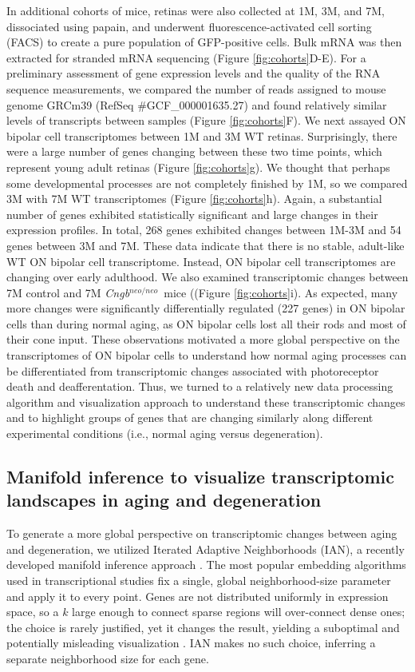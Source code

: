 \documentclass[11pt, a4paper]{article}
\newcommand{\cngb}{\textit{Cngb$^{neo/neo}$}~}
\begin{document}
In additional cohorts of mice, retinas were also collected at 1M, 3M, and 7M, dissociated using papain, and underwent fluorescence-activated cell sorting (FACS) to create a pure population of GFP-positive cells.  Bulk mRNA was then extracted for stranded mRNA sequencing (Figure \ref{fig:cohorts}D-E).  For a preliminary assessment of gene expression levels and the quality of the RNA sequence measurements, we compared the number of reads assigned to mouse genome GRCm39 (RefSeq \#GCF\_000001635.27) and found relatively similar levels of transcripts between samples (Figure \ref{fig:cohorts}F). We next assayed ON bipolar cell transcriptomes between 1M and 3M WT retinas. Surprisingly, there were a large number of genes changing between these two time points, which represent young adult retinas (Figure \ref{fig:cohorts}g). We thought that perhaps some developmental processes are not completely finished by 1M, so we compared 3M with 7M WT transcriptomes (Figure \ref{fig:cohorts}h). Again, a substantial number of genes exhibited statistically significant and large changes in their expression profiles. In total, 268 genes exhibited changes between 1M-3M and 54 genes between 3M and 7M. These data indicate that there is no stable, adult-like WT ON bipolar cell transcriptome. Instead, ON bipolar cell transcriptomes are changing over early adulthood. We also examined transcriptomic changes between 7M control and 7M \cngb mice ((Figure \ref{fig:cohorts}i). As expected, many more changes were significantly differentially regulated (227 genes) in ON bipolar cells than during normal aging, as ON bipolar cells lost all their rods and most of their cone input. These observations motivated a more global perspective on the transcriptomes of ON bipolar cells to understand how normal aging processes can be differentiated from transcriptomic changes associated with photoreceptor death and deafferentation. Thus, we turned to a relatively new data processing algorithm and visualization approach to understand these transcriptomic changes and to highlight groups of genes that are changing similarly along different experimental conditions (i.e., normal aging versus degeneration). 

\subsection*{Manifold inference to visualize transcriptomic landscapes in aging and degeneration}

To generate a more global perspective on transcriptomic changes between aging and degeneration, we utilized Iterated Adaptive Neighborhoods (IAN), a recently developed manifold inference approach \citep{Dyballa2023-ur}. The most popular embedding algorithms used in transcriptional studies fix a single, global neighborhood-size parameter and apply it to every point. Genes are not distributed uniformly in
expression space, so a $k$ large enough to connect sparse regions will over-connect dense ones; the choice is rarely justified, yet it changes the result, yielding a suboptimal and potentially misleading visualization \citep{Kobak2019}. IAN makes no such choice, inferring a separate neighborhood size for each gene.
\end{document}
